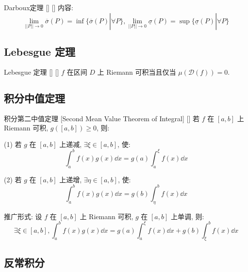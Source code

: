 \documentclass[UTF8]{ctexart}
\begin{document}
			\begin{thm}
			    []
			    {Darboux定理}
			    []
			    []
				内容: 
				\[\lim_{||P||\to 0}\overline{\sigma}(P)=\inf\{\overline{\sigma}(P)|\forall P\}, \lim_{||P||\to 0}\underline{\sigma}(P)=\sup\{\underline{\sigma}(P)|\forall P\}\]
			\end{thm}

        \subsection{Lebesgue 定理}
            
            \begin{thm}
			    []
			    {Lebesgue 定理}
			    []
			    []
                \(f\) 在区间 \(D\) 上 Riemann 可积当且仅当 \(\mu(\mathcal{D}(f))=0\). 
            \end{thm}

        \subsection{积分中值定理}
			
			\begin{thm}
			    []
			    {积分第二中值定理 }
			    [Second Mean Value Theorem of Integral]
			    []
				若 \(f\) 在 \([a,b]\) 上 Riemann 可积, \(g([a,b])\geq 0\), 则: 
				
				(1) 若 \(g\) 在 \([a,b]\) 上递减, \(\exists\xi\in[a,b]\), 使: 
				\[\int_a^b f(x)g(x)\dd x=g(a)\int_a^\xi f(x)\dd x\]

				(2) 若 \(g\) 在 \([a,b]\) 上递增, \(\exists\eta\in[a,b]\), 使: 
				\[\int_a^b f(x)g(x)\dd x=g(b)\int_\eta^b f(x)\dd x\]

			    {}
			    {推广形式: }
			    {}
			    {}
				设 \(f\) 在 \([a,b]\) 上 Riemann 可积, \(g\) 在 \([a,b]\) 上单调, 则: 
				\[\exists\xi\in[a,b], \int_a^b f(x)g(x)\dd x=g(a)\int_a^\xi f(x)\dd x+g(b)\int_\xi^b f(x)\dd x\]
			\end{thm}

        \subsection{反常积分}
            
\end{document}
